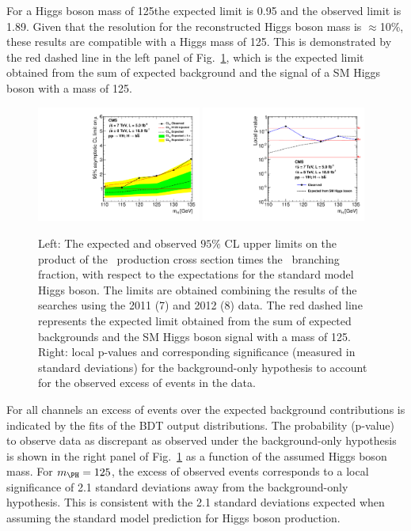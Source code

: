 \documentclass[11pt,twoside,a4paper,cmspaper,final,collab]{cms-tdr}
\begin{document}
For a Higgs
boson mass of 125\GeV the expected limit is 0.95 and the observed
limit is 1.89. Given that the resolution for the reconstructed Higgs
boson mass is $\approx$10\%, these results are compatible with a
Higgs mass of 125\GeV. This is demonstrated by the red dashed line in
the left panel of Fig.~\ref{fig:Limits}, which is the expected
limit obtained from the sum of expected background and the signal
of a SM Higgs boson with a mass of 125\GeV.


\begin{figure}[tbh]
  \begin{center}
   \includegraphics[width=0.48\textwidth]{PRD_limits_Oct08}
   \includegraphics[width=0.48\textwidth]{PRD_pvalue_Sept11}
   \caption{Left: The expected and observed $95\%$ CL upper limits on the
product of the \VH\ production cross section times the \HBB\
branching fraction, with respect to the expectations for the standard model
Higgs boson. The limits are obtained combining the results of the
searches using the 2011 (7\TeV) and 2012
(8\TeV) data. The red dashed line represents the
expected limit obtained from the sum of expected backgrounds and the SM Higgs boson signal
with a mass of 125\GeV. Right: local p-values and corresponding significance
(measured in standard deviations) for the background-only hypothesis to account for
the observed excess of events in the data.}
    \label{fig:Limits}
  \end{center}
\end{figure}


For all channels an excess of events over the expected background
contributions is indicated by the fits of the BDT output distributions.
The probability  (p-value)  to observe data as discrepant as observed
under the background-only hypothesis is shown in
the right panel of Fig.~\ref{fig:Limits} as a function of the assumed
Higgs boson mass.
For $\mH =125$\GeV, the excess of observed events corresponds to a
local significance of 2.1 standard deviations away from the background-only hypothesis.
This is consistent with the 2.1 standard deviations expected when assuming the standard model prediction for Higgs boson
production.
\end{document}
